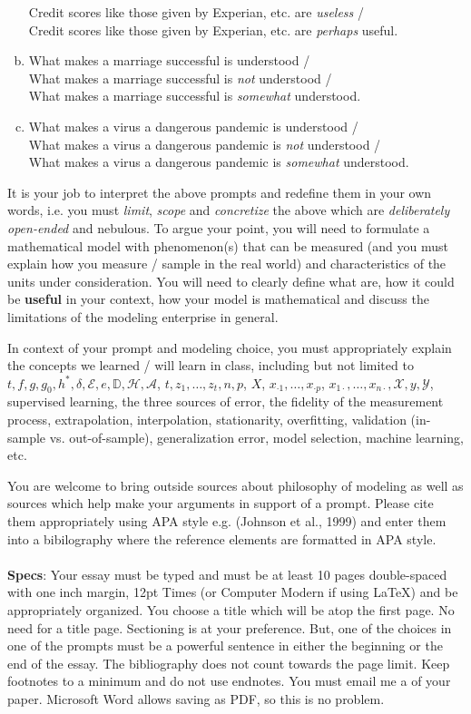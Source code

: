 \documentclass[12pt]{article}
\begin{document}
\begin{enumerate}[(a)]
Credit scores like those given by Experian, etc. are \textit{useless} / \\
Credit scores like those given by Experian, etc. are \textit{perhaps} useful.
\item What makes a marriage successful is understood / \\
What makes a marriage successful is \emph{not} understood / \\
What makes a marriage successful is \emph{somewhat} understood.
\item What makes a virus a dangerous pandemic is understood / \\
What makes a virus a dangerous pandemic is \emph{not} understood / \\
What makes a virus a dangerous pandemic is \emph{somewhat} understood.
\end{enumerate}

\noindent It is your job to interpret the above prompts and redefine them in your own words, i.e. you must \textit{limit}, \textit{scope} and \textit{concretize} the above which are \textit{deliberately open-ended} and nebulous. To argue your point, you will need to formulate a mathematical model with phenomenon(s) that can be measured (and you must explain how you measure / sample in the real world) and characteristics of the units under consideration. You will need to clearly define what  are, how it could be \textbf{useful} in your context, how your model is mathematical and discuss the limitations of the modeling enterprise in general. 

In context of your prompt and modeling choice, you must appropriately explain the concepts we learned / will learn in class, including but not limited to $t ,f, g, g_0, h^*, \delta, \mathcal{E}, e, \mathbb{D}, \mathcal{H}, \mathcal{A}$, $t, z_1, \ldots, z_t, n, p$, $X$, $x_{\cdot 1}, \ldots, x_{\cdot p}$, $x_{1 \cdot}, \ldots, x_{n \cdot}, \mathcal{X}, y, \mathcal{Y}$, supervised learning, the three sources of error, the fidelity of the measurement process, extrapolation, interpolation, stationarity, overfitting, validation (in-sample vs. out-of-sample), generalization error, model selection, machine learning, etc. 

You are welcome to bring outside sources about philosophy of modeling as well as sources which help make your arguments in support of a prompt. Please cite them appropriately using APA style e.g. (Johnson et al., 1999) and enter them into a bibilography where the reference elements are formatted in APA style.\\
~\\
\textbf{Specs}: Your essay must be typed and must be at least 10 pages double-spaced with one inch margin, 12pt Times (or Computer Modern if using \LaTeX) and be appropriately organized. You choose a title which will be atop the first page. No need for a title page. Sectioning is at your preference. But, one of the choices in one of the prompts must be a powerful sentence in either the beginning or the end of the essay. The bibliography does not count towards the page limit. Keep footnotes to a minimum and do not use endnotes. You must email me a   of your paper. Microsoft Word allows saving as PDF, so this is no problem.
\end{document}
